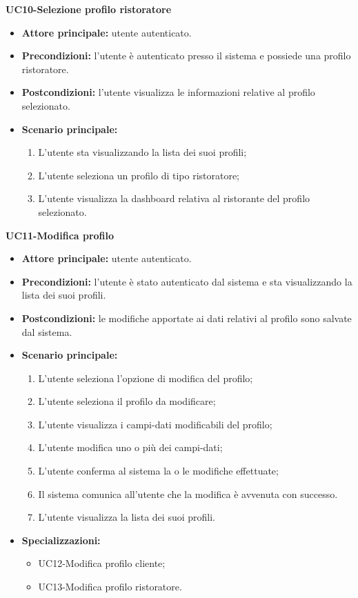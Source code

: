 \textbf{UC10-Selezione profilo ristoratore}
\begin{itemize}
\item \textbf{Attore principale:} utente autenticato.
\item \textbf{Precondizioni:} l'utente è autenticato presso il sistema e possiede una profilo ristoratore.
\item \textbf{Postcondizioni:} l'utente visualizza le informazioni relative al profilo selezionato.
\item \textbf{Scenario principale:}
\begin{enumerate}
    \item L'utente sta visualizzando la lista dei suoi profili;
    \item L'utente seleziona un profilo di tipo ristoratore;
    \item L'utente visualizza la dashboard relativa al ristorante del profilo selezionato.
\end{enumerate}
\end{itemize}

\textbf{UC11-Modifica profilo }
\begin{itemize}
\item \textbf{Attore principale:} utente autenticato.
\item \textbf{Precondizioni:} l'utente è stato autenticato dal sistema e sta visualizzando la lista dei suoi profili.
\item \textbf{Postcondizioni:} le modifiche apportate ai dati relativi al profilo sono salvate dal sistema.
\item \textbf{Scenario principale:}
\begin{enumerate}
    \item L'utente seleziona l'opzione di modifica del profilo;
    \item L'utente seleziona il profilo da modificare;
    \item L'utente visualizza i campi-dati modificabili del profilo;
    \item L'utente modifica uno o più dei campi-dati;
    \item L'utente conferma al sistema la o le modifiche effettuate;
    \item Il sistema comunica all'utente che la modifica è avvenuta con successo.
    \item L'utente visualizza la lista dei suoi profili.
\end{enumerate}
    \item \textbf{Specializzazioni:}
        \begin{itemize}
            \item UC12-Modifica profilo cliente;
            \item UC13-Modifica profilo ristoratore.
        \end{itemize}
\end{itemize}


